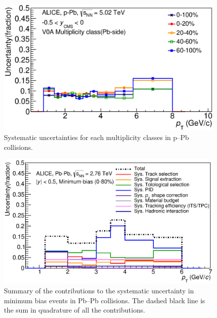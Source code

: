 \begin{figure}[htbp]
\begin{center}
\includegraphics[width=12.0cm]{./Version1/FigChapter5/Systematic/pPbCent.eps}
\caption{Systematic uncertainties for each multiplicity classes in p--Pb collisions.} 
\label{fig:pPb:syscent}
\end{center}
\end{figure}


\begin{figure}[htbp]
\begin{center}
\includegraphics[width=12.0cm]{./Version1/FigChapter5/Systematic/PbPbSysTotalFinal.eps}
\caption{Summary of the contributions to the systematic uncertainty in minimum bias events in Pb--Pb collisions. The dashed black line is the sum in quadrature of all the contributions.} 
\label{fig:PbPb:syserrortot}
\end{center}
\end{figure}


